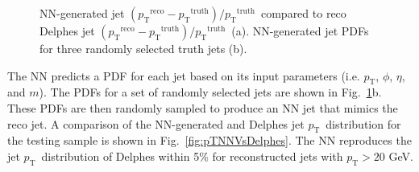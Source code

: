 \documentclass[showpacs,showkeys,preprint,prd,nofootinbib,linenumbers,12pt,superscriptaddress]{revtex4-1}
\def\pt{\ensuremath{p_{\mathrm{T}}}}
\def\ptRes{\ensuremath{(\pt^{\mathrm{reco}}-\pt^{\mathrm{truth}})/\pt^{\mathrm{truth}}}}
\begin{document}
\begin{figure}[htb]
  \caption{NN-generated jet \ptRes\ compared to reco Delphes jet \ptRes\ (a). NN-generated jet PDFs for three randomly selected truth jets (b).}
  \label{fig:PDFComp}
\end{figure}

The NN predicts a PDF for each jet based on its input parameters (i.e. \pt, $\phi$, $\eta$, and $m$). The PDFs for a set of randomly selected jets are shown in Fig.~\ref{fig:PDFComp}b. These PDFs are then randomly sampled to produce an NN jet that mimics the reco jet. A comparison of the NN-generated and Delphes jet \pt\ distribution for the testing sample is shown in Fig.~\ref{fig:pTNNVsDelphes}. The NN reproduces the jet \pt\ distribution of Delphes within 5\% for reconstructed jets with $\pt>20$ GeV. 
\end{document}
